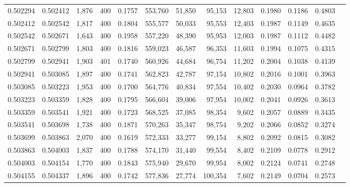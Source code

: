 \begin{tabular}{rrrrrrrrrrrrr}
0.502294 & 0.502412 & 1,876 & 400 &                                     0.1757 & 553,760 &  51,850 &  95,153 &  12,803 & 0.1980 & 0.1186 & 0.4803 \\
0.502412 & 0.502542 & 1,817 & 400 &                                     0.1804 & 555,577 &  50,033 &  95,553 &  12,403 & 0.1987 & 0.1149 & 0.4635 \\
0.502542 & 0.502671 & 1,643 & 400 &                                     0.1958 & 557,220 &  48,390 &  95,953 &  12,003 & 0.1987 & 0.1112 & 0.4482 \\
0.502671 & 0.502799 & 1,803 & 400 &                                     0.1816 & 559,023 &  46,587 &  96,353 &  11,603 & 0.1994 & 0.1075 & 0.4315 \\
0.502799 & 0.502941 & 1,903 & 401 &                                     0.1740 & 560,926 &  44,684 &  96,754 &  11,202 & 0.2004 & 0.1038 & 0.4139 \\
0.502941 & 0.503085 & 1,897 & 400 &                                     0.1741 & 562,823 &  42,787 &  97,154 &  10,802 & 0.2016 & 0.1001 & 0.3963 \\
0.503085 & 0.503223 & 1,953 & 400 &                                     0.1700 & 564,776 &  40,834 &  97,554 &  10,402 & 0.2030 & 0.0964 & 0.3782 \\
0.503223 & 0.503359 & 1,828 & 400 &                                     0.1795 & 566,604 &  39,006 &  97,954 &  10,002 & 0.2041 & 0.0926 & 0.3613 \\
0.503359 & 0.503541 & 1,921 & 400 &                                     0.1723 & 568,525 &  37,085 &  98,354 &   9,602 & 0.2057 & 0.0889 & 0.3435 \\
0.503541 & 0.503698 & 1,738 & 400 &                                     0.1871 & 570,263 &  35,347 &  98,754 &   9,202 & 0.2066 & 0.0852 & 0.3274 \\
0.503699 & 0.503863 & 2,070 & 400 &                                     0.1619 & 572,333 &  33,277 &  99,154 &   8,802 & 0.2092 & 0.0815 & 0.3082 \\
0.503863 & 0.504003 & 1,837 & 400 &                                     0.1788 & 574,170 &  31,440 &  99,554 &   8,402 & 0.2109 & 0.0778 & 0.2912 \\
0.504003 & 0.504154 & 1,770 & 400 &                                     0.1843 & 575,940 &  29,670 &  99,954 &   8,002 & 0.2124 & 0.0741 & 0.2748 \\
0.504155 & 0.504337 & 1,896 & 400 &                                     0.1742 & 577,836 &  27,774 & 100,354 &   7,602 & 0.2149 & 0.0704 & 0.2573 \\

\end{tabular}
